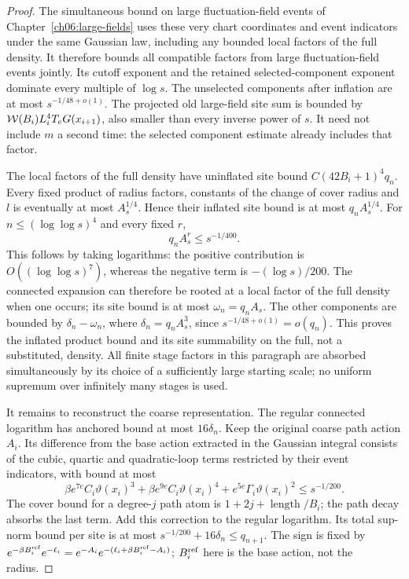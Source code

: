 \begin{proof}
The simultaneous bound on large fluctuation-field events of Chapter~\ref{ch06:large-fields}
uses these very chart coordinates and event indicators under the same Gaussian
law, including any bounded local factors of the full density. It therefore bounds
all compatible factors from large fluctuation-field events jointly. Its cutoff exponent
and the retained selected-component exponent dominate every multiple
of $\log s$. The unselected components after inflation are at most
$s^{-1/48+o(1)}$. The projected old large-field site sum is bounded
by ${\cal W}(B_i)L_i^4T_eG(x_{i+1})$, also smaller than every inverse
power of $s$. It need not include $m$ a second time: the selected
component estimate already includes that factor.

The local factors of the full density have uninflated site bound
$C(42B_i+1)^4q_n$. Every fixed product of radius factors, constants
of the change of cover radius and $l$ is eventually at most $A_s^{1/4}$.
Hence their inflated site bound is at most $q_nA_s^{1/4}$.
For $n\le(\log\log s)^4$ and every fixed $r$,
\[
 q_nA_s^r\le s^{-1/400}.
\]
This follows by taking logarithms: the positive contribution is
$O((\log\log s)^7)$, whereas the negative term is
$-(\log s)/200$. The connected expansion can therefore be rooted
at a local factor of the full density when one occurs; its site bound is at most
$\omega_n=q_nA_s$. The other components are bounded by
$\delta_n-\omega_n$, where $\delta_n=q_nA_s^3$, since
$s^{-1/48+o(1)}=o(q_n)$. This proves the inflated product bound and
its site summability on the full, not a substituted, density.
All finite stage factors in this paragraph are absorbed simultaneously
by its choice of a sufficiently large starting scale; no uniform supremum over infinitely many stages
is used.

It remains to reconstruct the coarse representation. The regular
connected logarithm has anchored bound at most $16\delta_n$.
Keep the original coarse path action $A_i$. Its difference from
the base action extracted in the Gaussian integral consists of the
cubic, quartic and quadratic-loop terms restricted by their event indicators, with bound at most
\[
 \beta e^{7e}C_i\vartheta(x_i)^3+
 \beta e^{9e}C_i\vartheta(x_i)^4+
 e^{5e}\Gamma_i\vartheta(x_i)^2\le s^{-1/200}.
\]
The cover bound for a degree-$j$ path atom is
$1+2j+\operatorname{length}/B_i$; the path decay absorbs the last term.
Add this correction to the regular logarithm. Its total sup-norm bound per site
is at most $s^{-1/200}+16\delta_n\le q_{n+1}$.
The sign is fixed by
$e^{-\beta B_i^{\rm ref}}e^{-\ell_i}
=e^{-A_i}e^{-(\ell_i+\beta B_i^{\rm ref}-A_i)}$;
$B_i^{\rm ref}$ here is the base action, not the radius.


\end{proof}
